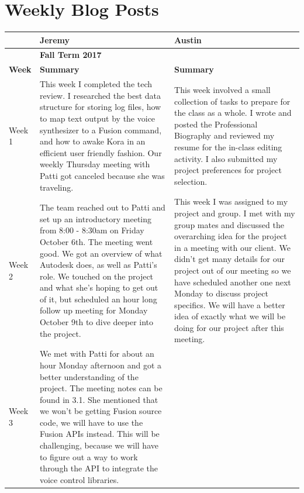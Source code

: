 \documentclass[onecolumn, draftclsnofoot,10pt, compsoc]{IEEEtran}
\begin{document}
\section{Weekly Blog Posts}
	\begin{center}
		\begin{longtabu} to \textwidth {|X[2,l]|X[8,l]|X[8,l]|}
			\hline
			& \textbf{\Large{Jeremy}} & \textbf{\Large{Austin}}  \\ \hline
			&	\textbf{\large{Fall Term 2017}}  &\\ \hline
			\textbf{Week} & \textbf{Summary}  & \textbf{Summary }\\ \hline
			
			Week 1 
			& 
			{
				This week I completed the tech review. I researched the best data structure for storing log files, how to map text output by the voice synthesizer to a Fusion command, and how to awake Kora in an efficient user friendly fashion.
				Our weekly Thursday meeting with Patti got canceled because she was traveling.
			}
			
			&
			{
				This week involved a small collection of tasks to prepare for the class as a whole.
				I wrote and posted the Professional Biography and reviewed my resume for the in-class editing activity.
				I also submitted my project preferences for project selection.	
			}
			\\ \hline
			
			Week 2 
			&  
			{
				The team reached out to Patti and set up an introductory meeting from 8:00 - 8:30am on Friday October 6th. The meeting went good. We got an overview of what Autodesk does, as well as Patti's role. We touched on the project and what she's hoping to get out of it, but scheduled an hour long follow up meeting for Monday October 9th to dive deeper into the project. 
			}
			
			&
			{
				This week I was assigned to my project and group.
				I met with my group mates and discussed the overarching idea for the project in a meeting with our client.
				We didn't get many details for our project out of our meeting so we have scheduled another one next Monday to discuss project specifics.
				We will have a better idea of exactly what we will be doing for our project after this meeting.
			}
			\\ \hline
			
			Week 3 
			&
			{
				We met with Patti for about an hour Monday afternoon and got a better understanding of the project. The meeting notes can be found in 3.1. She mentioned that we won't be getting Fusion source code, we will have to use the Fusion APIs instead. This will be challenging, because we will have to figure out a way to work through the API to integrate the voice control libraries.
				
}
\end{longtabu}
\end{center}
\end{document}
